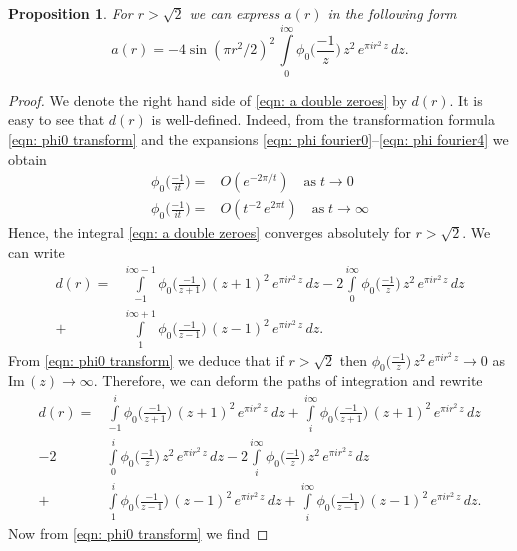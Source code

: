 \documentclass{scrartcl}
\renewcommand{\Im}{\mathrm{Im}\,}
\newtheorem{proposition}{Proposition}
\begin{document}
\begin{proposition}\label{prop: a(r) double zeroes} For $r>\sqrt{2}$ we can express $a(r)$ in the following form
\begin{equation}\label{eqn: a double zeroes}
  a(r)=-4\sin(\pi r^2/2)^2\,\int\limits_{0}^{i\infty}\phi_0\Big(\frac{-1}{z}\Big)\,z^2\,e^{\pi i r^2 \,z}\,dz.
\end{equation}
\end{proposition}
\begin{proof}
We denote the right hand side of \eqref{eqn: a double zeroes} by $d(r)$.  It is easy to see that $d(r)$ is well-defined. Indeed, from the transformation formula \eqref{eqn: phi0 transform} and the expansions \eqref{eqn: phi fourier0}--\eqref{eqn: phi fourier4} we obtain
\begin{align*}
\phi_0\Big(\frac{-1}{it}\Big)=&O(e^{-2\pi/t})\quad\mbox{as}\;t\to 0\\
\phi_0\Big(\frac{-1}{it}\Big)=&O(t^{-2}\,e^{2\pi t})\quad\mbox{as}\;t\to \infty
\end{align*}
Hence, the integral \eqref{eqn: a double zeroes} converges absolutely for $r>\sqrt{2}$.
 We can write %
\begin{align*}
 d(r)=&\int\limits_{-1}^{i\infty-1}\phi_0\Big(\frac{-1}{z+1}\Big)\,(z+1)^2\,e^{\pi i r^2 \,z}\,dz-
 2\int\limits_{0}^{i\infty}\phi_0\Big(\frac{-1}{z}\Big)\,z^2\,e^{\pi i r^2 \,z}\,dz\\
 +&\int\limits_{1}^{i\infty+1}\phi_0\Big(\frac{-1}{z-1}\Big)\,(z-1)^2\,e^{\pi i r^2 \,z}\,dz.
\end{align*}
From \eqref{eqn: phi0 transform} we deduce that if $r>\sqrt{2}$ then
$\phi_0\Big(\frac{-1}{z}\Big)\,z^2\,e^{\pi i r^2 \,z}\to 0$ as $\Im(z)\to\infty$. Therefore, we can deform the paths of integration
and rewrite
\begin{align*}
 d(r)=&\int\limits_{-1}^{i}\phi_0\Big(\frac{-1}{z+1}\Big)\,(z+1)^2\,e^{\pi i r^2 \,z}\,dz
 +\int\limits_{i}^{i\infty}\phi_0\Big(\frac{-1}{z+1}\Big)\,(z+1)^2\,e^{\pi i r^2 \,z}\,dz\\
 -2&\int\limits_{0}^{i}\phi_0\Big(\frac{-1}{z}\Big)\,z^2\,e^{\pi i r^2 \,z}\,dz
 -2\int\limits_{i}^{i\infty}\phi_0\Big(\frac{-1}{z}\Big)\,z^2\,e^{\pi i r^2 \,z}\,dz\\
 +&\int\limits_{1}^{i}\phi_0\Big(\frac{-1}{z-1}\Big)\,(z-1)^2\,e^{\pi i r^2 \,z}\,dz
 +\int\limits_{i}^{i\infty}\phi_0\Big(\frac{-1}{z-1}\Big)\,(z-1)^2\,e^{\pi i r^2 \,z}\,dz.
\end{align*}
Now from \eqref{eqn: phi0 transform} we find

\end{proof}
\end{document}
